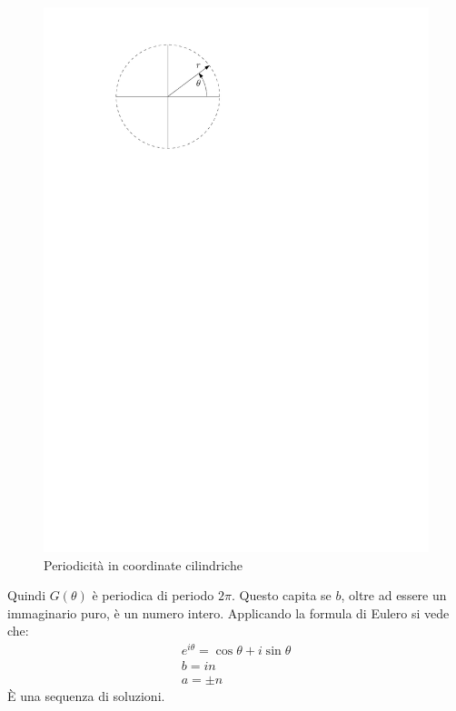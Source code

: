 	\begin{figure}[ht]
		\includegraphics[scale=0.7]{./7.3 Flusso irrotazionale/7.3-2}
		\centering
		\caption{Periodicità in coordinate cilindriche}
	\end{figure}
%
Quindi $G(\theta)$ è periodica di periodo $2 \pi$.
Questo capita se $b$, oltre ad essere un immaginario puro, è un numero intero.
Applicando la formula di Eulero si vede che:
%
	\begin{equation*}
		\begin{gathered}
			e^{i \theta} = \cos{\theta} + i \sin{\theta}\\
			b = in\\
			a = \pm  n			
		\end{gathered}
	\end{equation*}
%
È una sequenza di soluzioni.

